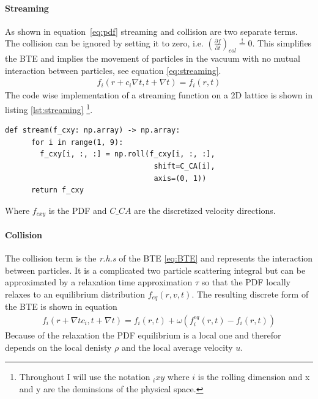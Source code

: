 \documentclass[a4paper,11pt]{article}
\begin{document}
\paragraph{Streaming}
As shown in equation~\ref{eq:pdf} streaming and collision are two separate terms.
The collision can be ignored by setting it to zero, i.e. $\left( \frac{\partial f}{\partial t} \right)_{col} \overset{!}{=} 0$.
This simplifies the BTE and implies the movement of particles in the vacuum with no mutual interaction between particles, see equation \ref{eq:streaming}.
\begin{equation}
  \label{eq:streaming}
  \begin{aligned}
    f_{i}(r+c_{i} \nabla t,t+\nabla t)=f_{i}(r,t)
  \end{aligned}
\end{equation}
The code wise implementation of a streaming function on a 2D lattice is shown in listing \ref{lst:streaming}
\footnote{Throughout I will use the notation $_ixy$ where $i$ is the rolling dimension and x and y are the deminsions of the physical space.}.
\begin{center}
  \begin{lstlisting}[caption=Implementation of the streaming term,label=lst:streaming, basicstyle=\small]
    def stream(f_cxy: np.array) -> np.array:
      for i in range(1, 9):
        f_cxy[i, :, :] = np.roll(f_cxy[i, :, :], 
                                  shift=C_CA[i], 
                                  axis=(0, 1))
      return f_cxy
  \end{lstlisting}
\end{center}
Where $f_{cxy}$ is the PDF and $C \_ CA$ are the discretized velocity directions.

\paragraph{Collision}
The collision term is the \textit{r.h.s} of the BTE \ref{eq:BTE} and represents the interaction between particles.
It is a complicated two particle scattering integral but can be approximated by a relaxation time approximation $\tau$ so that the PDF locally relaxes to an equilibrium distribution $f_{eq}(r,v,t)$.
The resulting discrete form of the BTE is shown in equation
\begin{equation}
  \label{eq:btw-discrete}
  \begin{aligned}
    f_{i}(r+ \nabla t c_{i},t+\nabla t)=f_{i}(r,t) + \omega \left( f_{i}^{eq}(r,t) - f_{i}(r,t) \right)
  \end{aligned}
\end{equation}
Because of the relaxation the PDF equilibrium is a local one and therefor depends on the local denisty $\rho$ and the local average velocity $u$.
\end{document}
